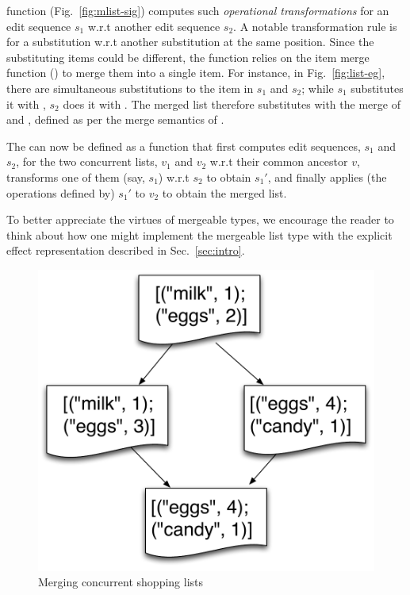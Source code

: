 \begin{itemize}
  function  (Fig.~\ref{fig:mlist-sig}) computes such
  \emph{operational transformations} for an edit sequence $s_1$ w.r.t
  another edit sequence $s_2$. A notable transformation rule is for a
  substitution w.r.t another substitution at the same position. Since
  the substituting items could be different, the function relies on
  the item merge function () to merge them into a single
  item. For instance, in Fig.~\ref{fig:list-eg}, there are
  simultaneous substitutions to the item  in $s_1$ and $s_2$;
  while $s_1$ substitutes it with , $s_2$ does it with . The
  merged list therefore substitutes  with the merge of  and
  , defined as per the merge semantics of .
\end{itemize}
The  can now be defined as a function that first
computes edit sequences, $s_1$ and $s_2$, for the two concurrent
lists, $v_1$ and $v_2$ w.r.t their common ancestor $v$, transforms one
of them (say, $s_1$) w.r.t $s_2$ to obtain $s_1'$, and finally applies
(the operations defined by) $s_1'$ to $v_2$ to obtain the merged list.

 To better appreciate the virtues
of mergeable types, we encourage the reader to think about how one
might implement the mergeable list type with the explicit effect
representation described in Sec.~\ref{sec:intro}.

\begin{figure}
  \centering
  \includegraphics[scale=0.4]{Figures/shopping-list}

  \caption{Merging concurrent shopping lists}
  \label{fig:shopping-list}
\end{figure}

